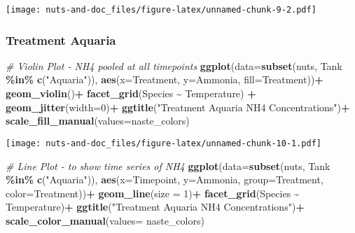 \documentclass[
]{article}
\newenvironment{Shaded}{\begin{snugshade}}{\end{snugshade}}
\newcommand{\AttributeTok}[1]{\textcolor[rgb]{0.13,0.29,0.53}{#1}}
\newcommand{\CommentTok}[1]{\textcolor[rgb]{0.56,0.35,0.01}{\textit{#1}}}
\newcommand{\DecValTok}[1]{\textcolor[rgb]{0.00,0.00,0.81}{#1}}
\newcommand{\FunctionTok}[1]{\textcolor[rgb]{0.13,0.29,0.53}{\textbf{#1}}}
\newcommand{\NormalTok}[1]{#1}
\newcommand{\SpecialCharTok}[1]{\textcolor[rgb]{0.81,0.36,0.00}{\textbf{#1}}}
\newcommand{\StringTok}[1]{\textcolor[rgb]{0.31,0.60,0.02}{#1}}
\begin{document}
\texttt{[image: nuts-and-doc\_files/figure-latex/unnamed-chunk-9-2.pdf]}

\hypertarget{treatment-aquaria-1}{%
\subsubsection{Treatment Aquaria}\label{treatment-aquaria-1}}

\begin{Shaded}
\begin{Highlighting}[]
\CommentTok{\# Violin Plot {-} NH4 pooled at all timepoints}
\FunctionTok{ggplot}\NormalTok{(}\AttributeTok{data=}\FunctionTok{subset}\NormalTok{(nuts, Tank }\SpecialCharTok{\%in\%} \FunctionTok{c}\NormalTok{(}\StringTok{"Aquaria"}\NormalTok{)), }\FunctionTok{aes}\NormalTok{(}\AttributeTok{x=}\NormalTok{Treatment, }\AttributeTok{y=}\NormalTok{Ammonia, }\AttributeTok{fill=}\NormalTok{Treatment))}\SpecialCharTok{+}
  \FunctionTok{geom\_violin}\NormalTok{()}\SpecialCharTok{+}
  \FunctionTok{facet\_grid}\NormalTok{(Species }\SpecialCharTok{\textasciitilde{}}\NormalTok{ Temperature) }\SpecialCharTok{+}
  \FunctionTok{geom\_jitter}\NormalTok{(}\AttributeTok{width=}\DecValTok{0}\NormalTok{)}\SpecialCharTok{+}
  \FunctionTok{ggtitle}\NormalTok{(}\StringTok{"Treatment Aquaria NH4 Concentrations"}\NormalTok{)}\SpecialCharTok{+}
  \FunctionTok{scale\_fill\_manual}\NormalTok{(}\AttributeTok{values=}\NormalTok{naste\_colors)}
\end{Highlighting}
\end{Shaded}

\texttt{[image: nuts-and-doc\_files/figure-latex/unnamed-chunk-10-1.pdf]}

\begin{Shaded}
\begin{Highlighting}[]
\CommentTok{\# Line Plot {-} to show time series of NH4}
\FunctionTok{ggplot}\NormalTok{(}\AttributeTok{data=}\FunctionTok{subset}\NormalTok{(nuts, Tank }\SpecialCharTok{\%in\%} \FunctionTok{c}\NormalTok{(}\StringTok{"Aquaria"}\NormalTok{)), }\FunctionTok{aes}\NormalTok{(}\AttributeTok{x=}\NormalTok{Timepoint, }\AttributeTok{y=}\NormalTok{Ammonia, }\AttributeTok{group=}\NormalTok{Treatment, }\AttributeTok{color=}\NormalTok{Treatment))}\SpecialCharTok{+}
  \FunctionTok{geom\_line}\NormalTok{(}\AttributeTok{size =} \DecValTok{1}\NormalTok{)}\SpecialCharTok{+}
  \FunctionTok{facet\_grid}\NormalTok{(Species }\SpecialCharTok{\textasciitilde{}}\NormalTok{ Temperature)}\SpecialCharTok{+}
  \FunctionTok{ggtitle}\NormalTok{(}\StringTok{"Treatment Aquaria NH4 Concentrations"}\NormalTok{)}\SpecialCharTok{+}
  \FunctionTok{scale\_color\_manual}\NormalTok{(}\AttributeTok{values=}\NormalTok{ naste\_colors)}
\end{Highlighting}
\end{Shaded}
\end{document}
